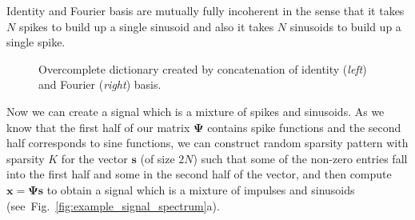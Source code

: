 \documentclass[journal]{IEEEtran}
\begin{document}
Identity and Fourier basis are mutually fully incoherent in the sense that it takes $N$ spikes to build up a single sinusoid and also it takes $N$ sinusoids to build up a single spike.
%
\begin{figure}[h] 
	\centering
	
	\caption{Overcomplete dictionary created by concatenation of identity (\textit{left}) and Fourier (\textit{right}) basis.}
	
	\label{fig:dictionary}
	
\end{figure}
%
Now we can create a signal which is a mixture of spikes and sinusoids. As we know that the first half of our matrix $\boldsymbol{\Psi}$ contains spike functions and the second half corresponds to sine functions, we can construct random sparsity pattern with sparsity $K$ for the vector $\boldsymbol{s}$ (of size $2N$) such that some of the non-zero entries fall into the first half and some in the second half of the vector, and then compute $\boldsymbol{x}=\boldsymbol{\Psi} \boldsymbol{s}$ to obtain a signal which is a mixture of impulses and sinusoids (see~Fig.~\ref{fig:example_signal_spectrum}a).
%
\end{document}
